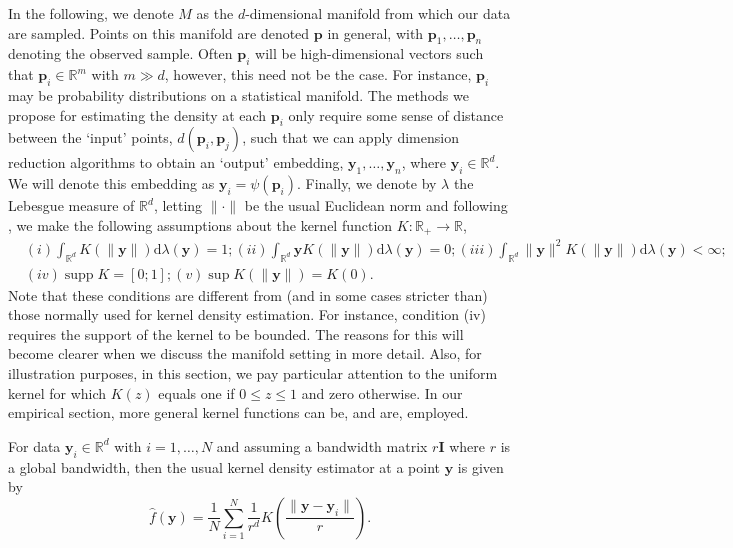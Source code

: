 \documentclass[11pt,a4paper,]{article}
\DeclareMathOperator\supp{supp}
\begin{document}
In the following, we denote \(M\) as the \(d\)-dimensional manifold from which our data are sampled. Points on this manifold are denoted \(\pmb{p}\) in general, with \(\pmb{p}_1,\dots,\pmb{p}_n\) denoting the observed sample. Often \(\pmb{p}_i\) will be high-dimensional vectors such that \(\pmb{p}_i\in\mathbb{R}^m\) with \(m\gg d\), however, this need not be the case. For instance, \(\pmb{p}_i\) may be probability distributions on a statistical manifold. The methods we propose for estimating the density at each \(\pmb{p}_i\) only require some sense of distance between the `input' points, \(d(\pmb{p}_i,\pmb{p}_j)\), such that we can apply dimension reduction algorithms to obtain an `output' embedding, \(\pmb{y}_1,\dots,\pmb{y}_n\), where \(\pmb{y}_i\in\mathbb{R}^d\). We will denote this embedding as \(\pmb{y}_i=\psi(\pmb{p}_i)\). Finally, we denote by \(\lambda\) the Lebesgue measure of \(\mathbb{R}^d\), letting \(\|\cdot\|\) be the usual Euclidean norm and following \textcite{Pelletier2005-vu}, we make the following assumptions about the kernel function \(K:\mathbb{R}_+\rightarrow\mathbb{R}\),
\begin{align}
\label{eq:kernelcondition}
& (i) \int_{\mathbb{R}^{d}} K(\|\pmb{y}\|) \mathrm{d} \lambda(\pmb{y})=1;
(ii) \int_{\mathbb{R}^{d}} \pmb{y} K(\|\pmb{y}\|) \mathrm{d} \lambda(\pmb{y})=0;
(iii) \int_{\mathbb{R}^{d}}\|\pmb{y}\|^{2} K(\|\pmb{y}\|) \mathrm{d} \lambda(\pmb{y})<\infty; \\
& (iv) \supp K=[0; 1];
(v) \sup K(\|\pmb{y}\|)=K(0).
\end{align}
Note that these conditions are different from (and in some cases stricter than) those normally used for kernel density estimation. For instance, condition (iv) requires the support of the kernel to be bounded. The reasons for this will become clearer when we discuss the manifold setting in more detail. Also, for illustration purposes, in this section, we pay particular attention to the uniform kernel for which \(K(z)\) equals one if \(0\leq z\leq1\) and zero otherwise. In our empirical section, more general kernel functions can be, and are, employed.

For data \(\pmb{y}_i\in\mathbb{R}^d\) with \(i=1,\dots,N\) and assuming a bandwidth matrix \(r\pmb{I}\) where \(r\) is a global bandwidth, then the usual kernel density estimator at a point \(\pmb{y}\) is given by
\begin{equation}
\label{eq:vkde}
\hat{f}(\pmb{y})=\frac{1}{N}\sum\limits_{i=1}^N \frac{1}{r^d} K\left(\frac{\|\pmb{y}-\pmb{y}_i\|}{r}\right).
\end{equation}
\end{document}
